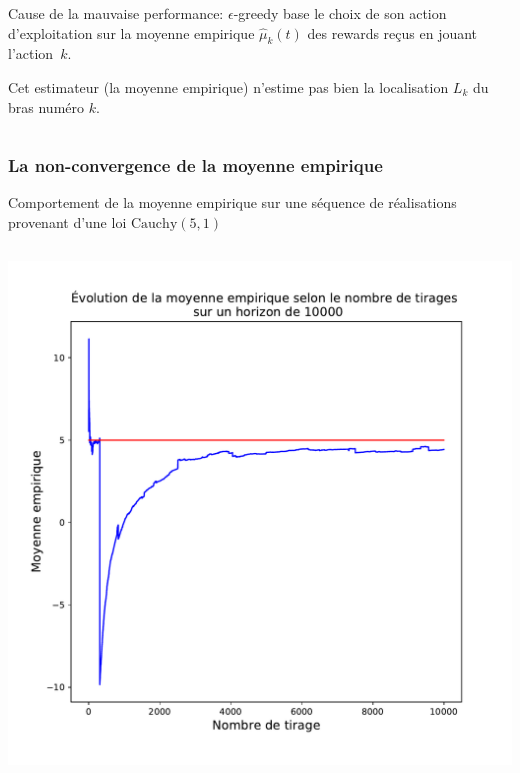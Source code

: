 \documentclass[8pt, sans]{beamer}
\begin{document}
\begin{frame}
\begin{columns}[T]
\begin{column}{0.5\linewidth}
\vspace*{1cm}
Cause de la mauvaise performance: $\epsilon$-greedy base le choix de son action d'exploitation sur la moyenne empirique $\hat \mu_k(t)$ des rewards reçus en jouant \mbox{l'action $k.$}

\vspace*{1cm}
\pause
Cet estimateur (la moyenne empirique) n'estime pas bien la localisation $L_k$ du bras numéro $k.$

\vfill
\end{column}
\end{columns}

\end{frame}

\begin{frame}
\frametitle{La non-convergence de la moyenne empirique}

Comportement de la moyenne empirique sur une séquence de réalisations provenant d'une loi $\mathrm{Cauchy}(5,1)$

\pause

\begin{columns}[T] %
\begin{column}{0.5\linewidth}
\includegraphics[scale=0.28]{graphique-moyenne-empirique-1.pdf}
\end{column}%
\hfill%


\end{columns}
\end{frame}
\end{document}
